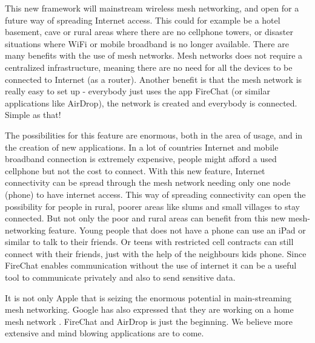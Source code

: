 This new framework will mainstream wireless mesh networking, and open for a future way of spreading Internet access. This could for example be a hotel basement, cave or rural areas where there are no cellphone towers, or disaster situations where WiFi or mobile broadband  is no longer available. There are many benefits with the use of mesh networks. Mesh networks does not require a centralized infrastructure, meaning there are no need for all the devices to be connected to Internet (as a router). Another benefit is that the mesh network is really easy to set up - everybody just uses the app FireChat (or similar applications like AirDrop), the network is created and everybody is connected. Simple as that! 

The possibilities for this feature are enormous, both in the area of usage, and in the creation of new applications. In a lot of countries Internet and mobile broadband connection is extremely expensive, people might afford a used cellphone but not the cost to connect. With this new feature, Internet connectivity can be spread through the mesh network needing only one node (phone) to have internet access. This way of spreading connectivity can open the possibility for people in rural, poorer areas like slums and small villages to stay connected. But not only the poor and rural areas can benefit from this new mesh-networking feature. Young people that does not have a phone can use an iPad or similar to talk to their friends. Or teens with restricted cell contracts can still connect with their friends, just with the help of the neighbours kids phone. Since FireChat enables communication without the use of internet it can be a useful tool to communicate privately and also to send sensitive data.
 
It is not only Apple that is seizing the enormous potential in main-streaming mesh networking. Google has also expressed that they are working on a home mesh network \cite{googleMesh}. FireChat and AirDrop is just the beginning. We believe more extensive and mind blowing applications are to come. 


